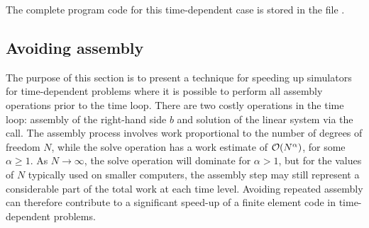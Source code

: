 The complete program code for this time-dependent case is stored in the
file .

\subsection{Avoiding assembly}
\label{langtangen:timedep:diffusion1:noassemble}

The purpose of this section is to present a technique for speeding up
\fenics{} simulators for time-dependent problems where it is possible
to perform all assembly operations prior to the time loop.  There are
two costly operations in the time loop: assembly of the right-hand side
$b$ and solution of the linear system via the  call. The
assembly process involves work proportional to the number of degrees of
freedom $N$, while the solve operation has a work estimate of ${\cal O}(
N^{\alpha})$, for some $\alpha\geqslant 1$. As $N\rightarrow\infty$, the
solve operation will dominate for $\alpha>1$, but for the values of $N$
typically used on smaller computers, the assembly step may still represent
a considerable part of the total work at each time level. Avoiding
repeated assembly can therefore contribute to a significant speed-up of
a finite element code in time-dependent problems.

